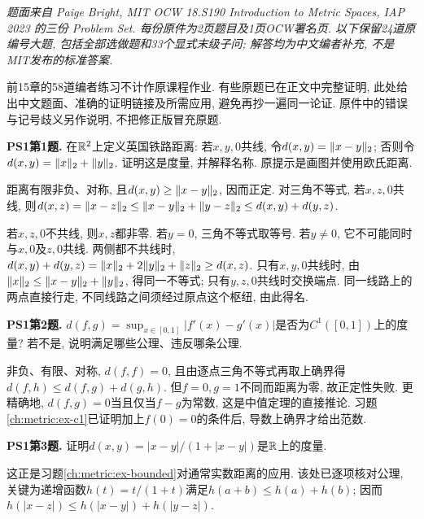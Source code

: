 \label{ch:official-metric}
\emph{题面来自 Paige Bright, MIT OCW 18.S190 Introduction to Metric Spaces, IAP 2023 的三份 Problem Set. 每份原件为2页题目及1页OCW署名页. 以下保留24道原编号大题, 包括全部选做题和33个显式末级子问; 解答均为中文编者补充, 不是MIT发布的标准答案.}

前15章的58道编者练习不计作原课程作业. 有些原题已在正文中完整证明, 此处给出中文题面、准确的证明链接及所需应用, 避免再抄一遍同一论证. 原件中的错误与记号歧义另作说明, 不把修正版冒充原题.

\begin{exercise}\label{ps190:1:1}
\textbf{PS1第1题.} 在$\mathbb R^2$上定义英国铁路距离: 若$x,y,0$共线, 令$d(x,y)=\lVert x-y\rVert_2$; 否则令$d(x,y)=\lVert x\rVert_2+\lVert y\rVert_2$. 证明这是度量, 并解释名称. 原提示是画图并使用欧氏距离.
\end{exercise}
\begin{solution}
距离有限非负、对称, 且$d(x,y)\ge\lVert x-y\rVert_2$, 因而正定. 对三角不等式, 若$x,z,0$共线, 则$d(x,z)=\lVert x-z\rVert_2\le\lVert x-y\rVert_2+\lVert y-z\rVert_2\le d(x,y)+d(y,z)$.

若$x,z,0$不共线, 则$x,z$都非零. 若$y=0$, 三角不等式取等号. 若$y\ne0$, 它不可能同时与$x,0$及$z,0$共线. 两侧都不共线时, $d(x,y)+d(y,z)=\lVert x\rVert_2+2\lVert y\rVert_2+\lVert z\rVert_2\ge d(x,z)$. 只有$x,y,0$共线时, 由$\lVert x\rVert_2\le\lVert x-y\rVert_2+\lVert y\rVert_2$, 得同一不等式; 只有$y,z,0$共线时交换端点. 同一线路上的两点直接行走, 不同线路之间须经过原点这个枢纽, 由此得名.
\end{solution}

\begin{exercise}\label{ps190:1:2}
\textbf{PS1第2题.} $d(f,g)=\sup_{x\in[0,1]}|f'(x)-g'(x)|$是否为$C^1([0,1])$上的度量? 若不是, 说明满足哪些公理、违反哪条公理.
\end{exercise}
\begin{solution}
非负、有限、对称, $d(f,f)=0$, 且由逐点三角不等式再取上确界得$d(f,h)\le d(f,g)+d(g,h)$. 但$f=0,g=1$不同而距离为零, 故正定性失败. 更精确地, $d(f,g)=0$当且仅当$f-g$为常数, 这是中值定理的直接推论. 习题\ref{ch:metric:ex-c1}已证明加上$f(0)=0$的条件后, 导数上确界才给出范数.
\end{solution}

\begin{exercise}\label{ps190:1:3}
\textbf{PS1第3题.} 证明$d(x,y)=|x-y|/(1+|x-y|)$是$\mathbb R$上的度量.
\end{exercise}
\begin{solution}
这正是习题\ref{ch:metric:ex-bounded}对通常实数距离的应用. 该处已逐项核对公理, 关键为递增函数$h(t)=t/(1+t)$满足$h(a+b)\le h(a)+h(b)$; 因而$h(|x-z|)\le h(|x-y|)+h(|y-z|)$.
\end{solution}

